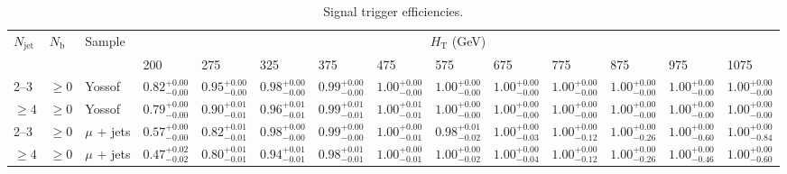 \documentclass[]{article}
\begin{document}
\clearpage
\begin{landscape}
\begin{center}
\begin{table}[h!]
\caption{Signal trigger efficiencies.}
\centering
\scriptsize
\begin{tabular}{llllllllllllll}
\hline
\hline
$N_{\textrm{jet}}$ & $N_{\textrm{b}}$ & Sample & \multicolumn{11}{c}{$H_{\textrm{T}}$ (GeV)} \\
\cline{4-14}
 & & &  200 & 275 & 325 & 375 & 475 & 575 & 675 & 775 & 875 & 975 & 1075 \\
 \hline
 2--3 & $\geq 0$ & Yossof & $0.82^{+0.00}_{-0.00}$ & $0.95^{+0.00}_{-0.00}$ & $0.98^{+0.00}_{-0.00}$ & $0.99^{+0.00}_{-0.00}$ & $1.00^{+0.00}_{-0.00}$ & $1.00^{+0.00}_{-0.00}$ & $1.00^{+0.00}_{-0.00}$ & $1.00^{+0.00}_{-0.00}$ & $1.00^{+0.00}_{-0.00}$ & $1.00^{+0.00}_{-0.00}$ & $1.00^{+0.00}_{-0.00}$ \\
 $\geq 4$ & $\geq 0$ & Yossof & $0.79^{+0.00}_{-0.00}$ & $0.90^{+0.01}_{-0.01}$ & $0.96^{+0.01}_{-0.01}$ & $0.99^{+0.01}_{-0.01}$ & $1.00^{+0.01}_{-0.01}$ & $1.00^{+0.00}_{-0.00}$ & $1.00^{+0.00}_{-0.00}$ & $1.00^{+0.00}_{-0.00}$ & $1.00^{+0.00}_{-0.00}$ & $1.00^{+0.00}_{-0.00}$ & $1.00^{+0.00}_{-0.00}$ \\
 \hline
 2--3 & $\geq 0$ & $\mu$ + jets & $0.57^{+0.00}_{-0.00}$ & $0.82^{+0.01}_{-0.01}$ & $0.98^{+0.00}_{-0.00}$ & $0.99^{+0.00}_{-0.00}$ & $1.00^{+0.00}_{-0.01}$ & $0.98^{+0.01}_{-0.02}$ & $1.00^{+0.00}_{-0.03}$ & $1.00^{+0.00}_{-0.12}$ & $1.00^{+0.00}_{-0.26}$ & $1.00^{+0.00}_{-0.60}$ & $1.00^{+0.00}_{-0.84}$ \\
 $\geq 4$ & $\geq 0$ & $\mu$ + jets & $0.47^{+0.02}_{-0.02}$ & $0.80^{+0.01}_{-0.01}$ & $0.94^{+0.01}_{-0.01}$ & $0.98^{+0.01}_{-0.01}$ & $1.00^{+0.00}_{-0.01}$ & $1.00^{+0.00}_{-0.02}$ & $1.00^{+0.00}_{-0.04}$ & $1.00^{+0.00}_{-0.12}$ & $1.00^{+0.00}_{-0.26}$ & $1.00^{+0.00}_{-0.46}$ & $1.00^{+0.00}_{-0.60}$ \\
 \hline
 \hline
 \hline
 \end{tabular}
 \end{table}
 \end{center}
 \end{landscape}
 
\end{document}
